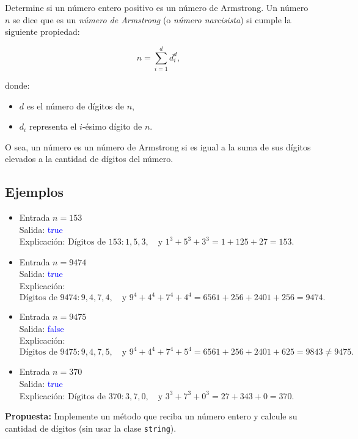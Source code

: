 Determine si un número entero positivo es un número de Armstrong. Un número \( n \) se dice que es un \textit{número de Armstrong} (o \textit{número narcisista}) si cumple la siguiente propiedad:

\[
n = \sum_{i=1}^{d} d_i^d,
\]

donde:
\begin{itemize}
    \item \(d\) es el número de dígitos de \(n\),
    \item \(d_i\) representa el \(i\)-ésimo dígito de \(n\).
\end{itemize}

O sea, un número es un número de Armstrong si es igual a la suma de sus dígitos elevados a la cantidad de dígitos del número.

\subsection*{Ejemplos}
\begin{itemize}
    \item Entrada \( n = 153 \)\\
    Salida: \textcolor{blue}{true}\\
    Explicación:
    \(
    \text{Dígitos de } 153: 1, 5, 3, \quad \text{y } 1^3 + 5^3 + 3^3 = 1 + 125 + 27 = 153.
    \)
    
    \item Entrada \( n = 9474 \)\\
    Salida: \textcolor{blue}{true}\\
    Explicación:
    \(
    \text{Dígitos de } 9474: 9, 4, 7, 4, \quad \text{y } 9^4 + 4^4 + 7^4 + 4^4 = 6561 + 256 + 2401 + 256 = 9474.
    \)

    \item Entrada \( n = 9475 \)\\
    Salida: \textcolor{blue}{false}\\
    Explicación:
    \(
    \text{Dígitos de } 9475: 9, 4, 7, 5, \quad \text{y } 9^4 + 4^4 + 7^4 + 5^4 = 6561 + 256 + 2401 + 625 = 9843 \neq 9475.
    \)
    
    \item Entrada \( n = 370 \)\\
    Salida: \textcolor{blue}{true}\\
    Explicación:
    \(
    \text{Dígitos de } 370: 3, 7, 0, \quad \text{y } 3^3 + 7^3 + 0^3 = 27 + 343 + 0 = 370.
    \)
\end{itemize}

\textbf{Propuesta:} Implemente un método que reciba un número entero y calcule su cantidad de dígitos (sin usar la clase \texttt{string}).
